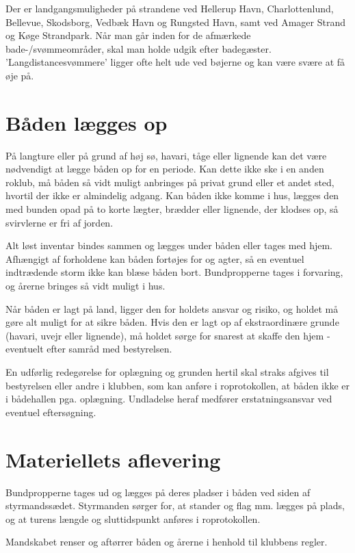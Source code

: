 \documentclass{article}
\begin{document}
Der er landgangsmuligheder på strandene ved Hellerup Havn,
Charlottenlund, Bellevue, Skodsborg, Vedbæk Havn og Rungsted Havn, samt
ved Amager Strand og Køge Strandpark. Når man går inden for de afmærkede
bade-/svømmeområder, skal man holde udgik efter badegæster.
’Langdistancesvømmere’ ligger ofte helt ude ved bøjerne og kan være svære
at få øje på.

\section{Båden lægges op}

På langture eller på grund af høj sø, havari, tåge eller lignende kan det
være nødvendigt at lægge båden op for en periode. Kan dette ikke ske i en
anden roklub, må båden så vidt muligt anbringes på privat grund eller et
andet sted, hvortil der ikke er almindelig adgang. Kan båden ikke komme i
hus, lægges den med bunden opad på to korte lægter, brædder eller
lignende, der klodses op, så svirvlerne er fri af jorden.

Alt løst inventar bindes sammen og lægges under båden eller tages med
hjem. Afhængigt af forholdene kan båden fortøjes for og agter, så en
eventuel indtrædende storm ikke kan blæse båden bort. Bundpropperne tages
i forvaring, og årerne bringes så vidt muligt i hus.

Når båden er lagt på land, ligger den for holdets ansvar og risiko, og
holdet må gøre alt muligt for at sikre båden. Hvis den er lagt op af
ekstraordinære grunde (havari, uvejr eller lignende), må holdet sørge for
snarest at skaffe den hjem - eventuelt efter samråd med bestyrelsen.

En udførlig redegørelse for oplægning og grunden hertil skal straks
afgives til bestyrelsen eller andre i klubben, som kan anføre i
roprotokollen, at båden ikke er i bådehallen pga. oplægning. Undladelse
heraf medfører erstatningsansvar ved eventuel eftersøgning.

\section{Materiellets aflevering}

Bundpropperne tages ud og lægges på deres pladser i båden ved siden af
styrmandssædet.  Styrmanden sørger for, at stander og flag mm. lægges på
plads, og at turens længde og sluttidspunkt anføres i roprotokollen.

Mandskabet renser og aftørrer båden og årerne i henhold til klubbens
regler.
\end{document}
